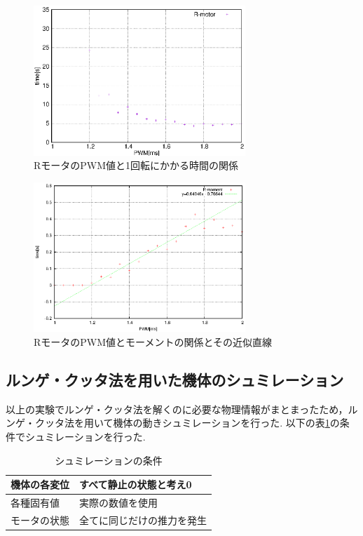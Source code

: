 \documentclass[12pt,oneside]{sotsuken_paper}
\begin{document}
\begin{figure}[htbp]
	\begin{center}
		\includegraphics[width=80mm]{image/moment/moment-time-R.eps}
		\caption{RモータのPWM値と1回転にかかる時間の関係}
		\label{fig:moment-time-R}
	\end{center}
\end{figure}

\begin{figure}[htbp]
	\begin{center}
		\includegraphics[width=80mm]{image/moment/moment.eps}
		\caption{RモータのPWM値とモーメントの関係とその近似直線}
		\label{fig:moment-R}
	\end{center}
\end{figure}

\subsection{ルンゲ・クッタ法を用いた機体のシュミレーション}
以上の実験でルンゲ・クッタ法を解くのに必要な物理情報がまとまったため，ルンゲ・クッタ法を用いて機体の動きシュミレーションを行った.
以下の表\ref{table:syumi}の条件でシュミレーションを行った.

\begin{table}[htbp]
	\begin{center}
		\caption{シュミレーションの条件}
		\begin{tabular}{|l|l|} \hline
			機体の各変位 & すべて静止の状態と考え0 \\ \hline 
			各種固有値 & 実際の数値を使用 \\ \hline
			モータの状態 & 全てに同じだけの推力を発生 \\ \hline
		\end{tabular}
		\label{table:syumi}
	\end{center}
\end{table}
\end{document}
